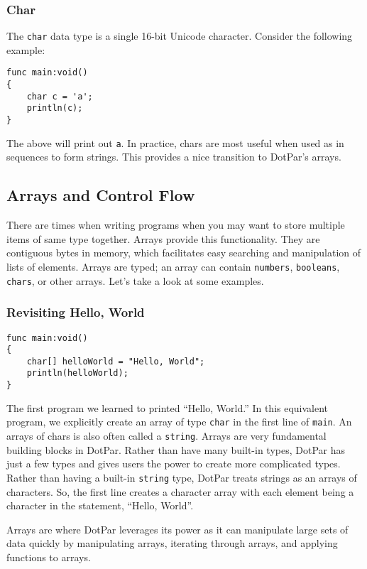 \subsubsection{Char}
The \verb=char= data type is a single 16-bit Unicode character. Consider the
following example:

\begin{verbatim}
func main:void()
{
    char c = 'a';
    println(c);
}
\end{verbatim}

The above will print out \verb=a=. In practice, chars are most useful when used
as in sequences to form strings. This provides a nice transition to DotPar's
arrays.

\subsection{Arrays and Control Flow}
There are times when writing programs when you may want to store multiple items
of same type together. Arrays provide this functionality. They are contiguous
bytes in memory, which facilitates easy searching and manipulation of lists of
elements. Arrays are typed; an array can contain \verb=numbers=,
\verb=booleans=, \verb=chars=, or other arrays. Let's take a look at some
examples.

\subsubsection{Revisiting Hello, World}

\begin{verbatim}
func main:void()
{
    char[] helloWorld = "Hello, World";
    println(helloWorld);
}
\end{verbatim}

The first program we learned to printed ``Hello, World.''  In
this equivalent program, we explicitly create an array of type \verb=char= in
the first line of \verb=main=. An arrays of chars is also often called a
\verb=string=. Arrays are very fundamental building blocks in DotPar. Rather
than have many built-in types, DotPar has just a few types and gives users the
power to create more complicated types. Rather than having a built-in
\verb=string= type, DotPar treats strings as an arrays of characters. So, the
first line creates a character array with each element being a character in the
statement, ``Hello, World''.

Arrays are where DotPar leverages its power as it can manipulate large sets of
data quickly by manipulating arrays, iterating through arrays, and applying
functions to arrays.

